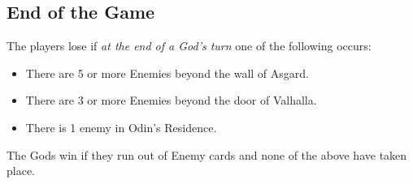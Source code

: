\documentclass[12pt]{article}
\newenvironment{itemizeCustom}
{\begin{itemize}
  \setlength{\itemsep}{1pt}
  \setlength{\parskip}{0pt}
  \setlength{\parsep}{0pt}}
{\end{itemize}}
\begin{document}
\begin{mdframed}[style = customFrame]
\begin{multicols*}{2}
\section*{End of the Game}
The players lose if \emph{at the end of a God's turn} one of the following occurs:
\begin{itemizeCustom}
	\item There are 5 or more Enemies beyond the wall of Asgard.
	\item There are 3 or more Enemies beyond the door of Valhalla.
	\item There is 1 enemy in Odin's Residence.
\end{itemizeCustom}

\noindent
The Gods win if they run out of Enemy cards and none of the above have taken place.

\end{multicols*}
\end{mdframed}
\end{document}
